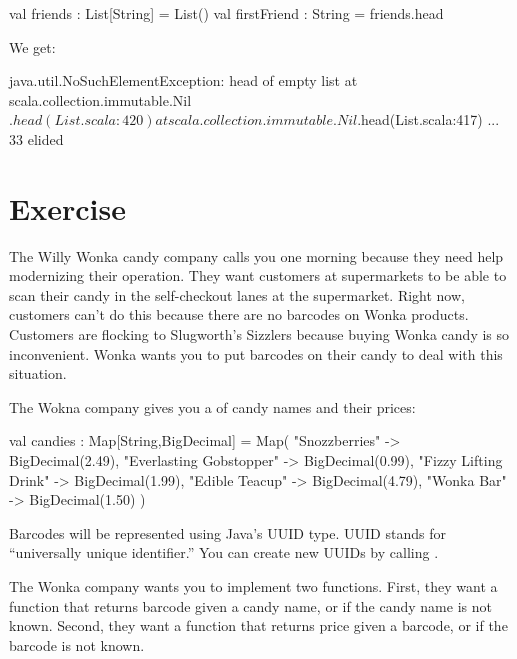\documentclass[9pt]{extbook}
\begin{document}
\begin{scalacode}
val friends : List[String] = List()
val firstFriend : String = friends.head
\end{scalacode}

We get:

\begin{scalacode}
java.util.NoSuchElementException: head of empty list
  at scala.collection.immutable.Nil$.head(List.scala:420)
  at scala.collection.immutable.Nil$.head(List.scala:417)
  ... 33 elided
\end{scalacode}

\section{Exercise}

The Willy Wonka candy company calls you one morning because they need help modernizing their operation.  They want customers at supermarkets to be able to scan their candy in the self-checkout lanes at the supermarket.  Right now, customers can't do this because there are no barcodes on Wonka products.  Customers are flocking to Slugworth's Sizzlers because buying Wonka candy is so inconvenient.  Wonka wants you to put barcodes on their candy to deal with this situation.

The Wokna company gives you a  of candy names and their prices:

\begin{scalacode}
val candies : Map[String,BigDecimal] = Map(
  "Snozzberries" -> BigDecimal(2.49),
  "Everlasting Gobstopper" -> BigDecimal(0.99),
  "Fizzy Lifting Drink" -> BigDecimal(1.99),
  "Edible Teacup" -> BigDecimal(4.79),
  "Wonka Bar" -> BigDecimal(1.50)
)
\end{scalacode}

Barcodes will be represented using Java's UUID type.  UUID stands for ``universally unique identifier.''  You can create new UUIDs by calling .

The Wonka company wants you to implement two functions.  First, they want a function  that returns  barcode given a candy name, or  if the candy name is not known.  Second, they want a function  that returns  price given a barcode, or  if the barcode is not known.
\end{document}
